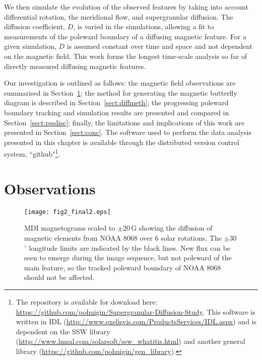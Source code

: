 We then simulate the evolution of the observed features by taking into account differential rotation, the meridional flow, and supergranular diffusion. The diffusion coefficient, $D$, is varied in the simulations, allowing a fit to measurements of the poleward boundary of a diffusing magnetic feature. For a given simulation, $D$ is assumed constant over time and space and not dependent on the magnetic field. This work forms the longest time-scale analysis so far of directly measured diffusing magnetic features.

Our investigation is outlined as follows: the magnetic field observations are summarised in Section~\ref{sect:obs}; the method for generating the magnetic butterfly diagram is described in Section~\ref{sect:diffmeth}; the progressing poleward boundary tracking and simulation results are presented and compared in Section~\ref{sect:resdisc}; finally, the limitations and implications of this work are presented in Section~\ref{sect:conc}. The software used to perform the data analysis presented in this chapter is available through the distributed version control system, ``github"\footnote{The repository is available for download here: \url{https://github.com/pohuigin/Supergranular-Diffusion-Study}. This software is written in IDL (\url{http://www.exelisvis.com/ProductsServices/IDL.aspx}) and is dependent on the SSW library (\url{http://www.lmsal.com/solarsoft/ssw\_whatitis.html}) and another general library (\url{https://github.com/pohuigin/gen\_library}).}.

\section{Observations}\label{sect:obs}

 \begin{figure}[!t]    %
   \centerline{\texttt{[image: fig2\_final2.eps]}
              }
              \caption[NOAA 8068 over 6 solar rotations.]{MDI magnetograms scaled to $\pm$20\,G showing the diffusion of magnetic elements from NOAA 8068 over 6 solar rotations. The $\pm$30$^\circ$ longitude limits are indicated by the black lines. New flux can be seen to emerge during the image sequence, but not poleward of the main feature, so the tracked poleward boundary of NOAA 8068 should not be affected.}
   \label{fig:obsmosaic}
   \end{figure}



